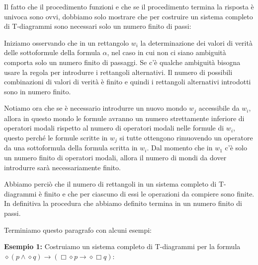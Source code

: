\documentclass[a4paper, titlepage, 12pt]{report}
\begin{document}
Il fatto che il procedimento funzioni e che se il procedimento termina la risposta è univoca
sono ovvi, dobbiamo solo mostrare che per costruire un sistema completo di T-diagrammi
sono necessari solo un numero finito di passi:

Iniziamo osservando che in un rettangolo $w_i$
la determinazione dei valori di verità delle sottoformule della formula $\alpha$,
nel caso in cui non ci siano ambiguità comporta solo un numero finito di passaggi.
Se c'è qualche ambiguità bisogna usare la regola per introdurre i rettangoli alternativi.
Il numero di possibili combinazioni di valori di verità è finito e quindi
i rettangoli alternativi introdotti sono in numero finito.

Notiamo ora che se è necessario introdurre un nuovo mondo $w_j$ accessibile da $w_i$,
allora in questo mondo le formule avranno un numero strettamente inferiore di operatori
modali rispetto al numero di operatori modali nelle formule di $w_i$, questo perché
le formule scritte in $w_j$ si tutte ottengono rimuovendo un operatore da una sottoformula
della formula scritta in $w_i$.
Dal momento che in $w_1$ c'è solo un numero finito di operatori
modali, allora il numero di mondi da dover introdurre sarà necessariamente finito.

Abbiamo perciò che il numero di rettangoli in un sistema completo di T-diagrammi è finito
e che per ciascuno di essi le operazioni da compiere sono finite. In definitiva
la procedura che abbiamo definito termina in un numero finito di passi.

Terminiamo questo paragrafo con alcuni esempi:

\pagebreak

\textbf{Esempio 1:}
Costruiamo un sistema completo di T-diagrammi per la formula
$\diamond (p \land \diamond q) \rightarrow (\Box \diamond p \rightarrow \diamond \Box q)$:
\end{document}
